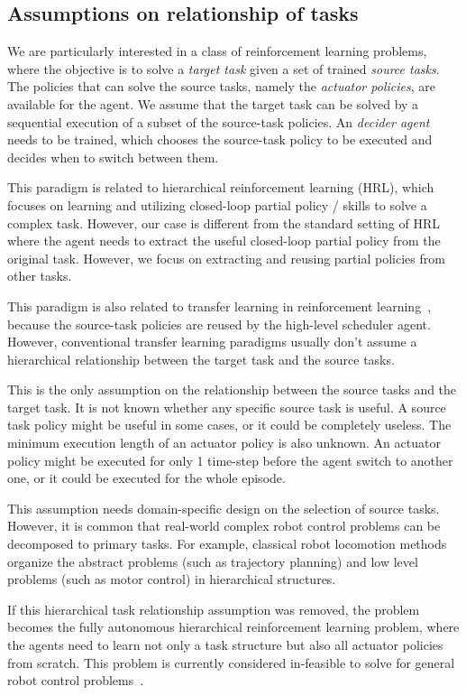 \subsection{Assumptions on relationship of tasks}

We are particularly interested in a class of reinforcement learning problems, where the objective is to solve a \textit{target task } given a set of trained \textit{source tasks}. The policies that can solve the source tasks, namely the \textit{actuator policies}, are available for the agent. We assume that the target task can be solved by a sequential execution of a subset of the source-task policies. An \textit{decider agent} needs to be trained, which chooses the source-task policy to be executed and decides when to switch between them.

This paradigm is related to hierarchical reinforcement learning (HRL), which focuses on learning and utilizing closed-loop partial policy / skills to solve a complex task. However, our case is different from the standard setting of HRL where the agent needs to extract the useful closed-loop partial policy from the original task. However, we focus on extracting and reusing partial policies from other tasks.

This paradigm is also related to transfer learning in reinforcement learning~\cite{taylor2009transfer}, because the source-task policies are reused by the high-level scheduler agent. However, conventional transfer learning paradigms usually don't assume a hierarchical relationship between the target task and the source tasks.

This is the only assumption on the relationship between the source tasks and the target task. It is not known whether any specific source task is useful. A source task policy might be useful in some cases, or it could be completely useless. The minimum execution length of an actuator policy is also unknown. An actuator policy might be executed for only 1 time-step before the agent switch to another one, or it could be executed for the whole episode.

This assumption needs domain-specific design on the selection of source tasks. However, it is common that real-world complex robot control problems can be decomposed to primary tasks. For example, classical robot locomotion methods organize the abstract problems (such as trajectory planning) and low level problems (such as motor control) in hierarchical structures.

If this hierarchical task relationship assumption was removed, the problem becomes the fully autonomous hierarchical reinforcement learning problem, where the agents need to learn not only a task structure but also all actuator policies from scratch. This problem is currently considered in-feasible to solve for general robot control problems~\cite{barto2003recent}.


